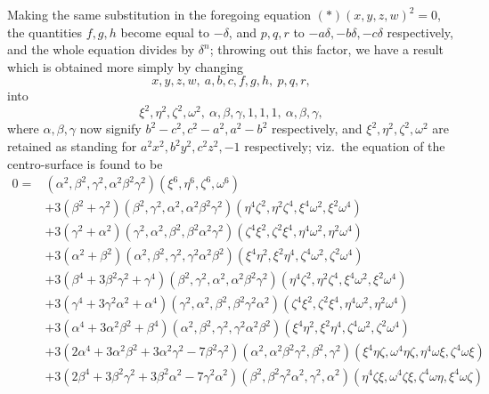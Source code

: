 \documentclass[11pt,a4paper]{article}
\begin{document}
Making the same substitution in the foregoing equation $(*)(x, y, z, w)^2 = 0$, the
quantities $f, g, h$ become equal to $-\delta$, and $p, q, r$ to $-a\delta, -b\delta, -c\delta$
respectively, and the whole equation divides by $\delta^n$; throwing out this factor, we have
a result which is obtained more simply by changing
\[
x, y, z, w,\ a, b, c, f, g, h,\ p, q, r,
\]
into
\[
\xi^2, \eta^2, \zeta^2, \omega^2,\ \alpha, \beta, \gamma, 1, 1, 1,\ \alpha, \beta, \gamma,
\]
where $\alpha, \beta, \gamma$ now signify $b^2 - c^2, c^2 - a^2, a^2 - b^2$ respectively,
and $\xi^2, \eta^2, \zeta^2, \omega^2$ are retained as standing for $a^2 x^2, b^2 y^2, c^2 z^2, -1$
respectively; viz.\ the equation of the centro-surface is found to be
\[
\begin{aligned}
0 = {}& (\alpha^2, \beta^2, \gamma^2, \alpha^2 \beta^2 \gamma^2)(\xi^6, \eta^6, \zeta^6, \omega^6) \\
& + 3 (\beta^2 + \gamma^2)(\beta^2, \gamma^2, \alpha^2, \alpha^2 \beta^2 \gamma^2)(\eta^4 \zeta^2, \eta^2 \zeta^4, \xi^4 \omega^2, \xi^2 \omega^4) \\
& + 3 (\gamma^2 + \alpha^2)(\gamma^2, \alpha^2, \beta^2, \beta^2 \alpha^2 \gamma^2)(\zeta^4 \xi^2, \zeta^2 \xi^4, \eta^4 \omega^2, \eta^2 \omega^4) \\
& + 3 (\alpha^2 + \beta^2)(\alpha^2, \beta^2, \gamma^2, \gamma^2 \alpha^2 \beta^2)(\xi^4 \eta^2, \xi^2 \eta^4, \zeta^4 \omega^2, \zeta^2 \omega^4) \\[2pt]
& + 3 (\beta^4 + 3 \beta^2 \gamma^2 + \gamma^4)(\beta^2, \gamma^2, \alpha^2, \alpha^2 \beta^2 \gamma^2)(\eta^4 \zeta^2, \eta^2 \zeta^4, \xi^4 \omega^2, \xi^2 \omega^4) \\
& + 3 (\gamma^4 + 3 \gamma^2 \alpha^2 + \alpha^4)(\gamma^2, \alpha^2, \beta^2, \beta^2 \gamma^2 \alpha^2)(\zeta^4 \xi^2, \zeta^2 \xi^4, \eta^4 \omega^2, \eta^2 \omega^4) \\
& + 3 (\alpha^4 + 3 \alpha^2 \beta^2 + \beta^4)(\alpha^2, \beta^2, \gamma^2, \gamma^2 \alpha^2 \beta^2)(\xi^4 \eta^2, \xi^2 \eta^4, \zeta^4 \omega^2, \zeta^2 \omega^4) \\[2pt]
& + 3 (2 \alpha^4 + 3 \alpha^2 \beta^2 + 3 \alpha^2 \gamma^2 - 7 \beta^2 \gamma^2)(\alpha^2, \alpha^2 \beta^2 \gamma^2, \beta^2, \gamma^2)(\xi^4 \eta \zeta, \omega^4 \eta \zeta, \eta^4 \omega \xi, \zeta^4 \omega \xi) \\
& + 3 (2 \beta^4 + 3 \beta^2 \gamma^2 + 3 \beta^2 \alpha^2 - 7 \gamma^2 \alpha^2)(\beta^2, \beta^2 \gamma^2 \alpha^2, \gamma^2, \alpha^2)(\eta^4 \zeta \xi, \omega^4 \zeta \xi, \zeta^4 \omega \eta, \xi^4 \omega \zeta) \\

\end{aligned}\]
\end{document}
